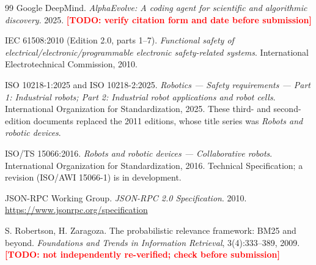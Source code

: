 \documentclass[11pt]{article}
\newcommand{\TODO}[1]{\textcolor{red}{\textbf{[TODO: #1]}}}
\begin{document}
\begin{thebibliography}{99}
 Google DeepMind. \emph{AlphaEvolve: A coding agent for scientific
and algorithmic discovery}. 2025. \TODO{verify citation form and date before submission}

 IEC 61508:2010 (Edition 2.0, parts 1--7). \emph{Functional safety of
electrical/electronic/programmable electronic safety-related systems}. International
Electrotechnical Commission, 2010.

 ISO 10218-1:2025 and ISO 10218-2:2025. \emph{Robotics --- Safety
requirements --- Part 1: Industrial robots; Part 2: Industrial robot applications and robot
cells}. International Organization for Standardization, 2025. These third- and
second-edition documents replaced the 2011 editions, whose title series was
\emph{Robots and robotic devices}.

 ISO/TS 15066:2016. \emph{Robots and robotic devices --- Collaborative
robots}. International Organization for Standardization, 2016. Technical Specification;
a revision (ISO/AWI 15066-1) is in development.

 JSON-RPC Working Group. \emph{JSON-RPC 2.0 Specification}. 2010.
\url{https://www.jsonrpc.org/specification}

 S. Robertson, H. Zaragoza. The probabilistic relevance framework:
BM25 and beyond. \emph{Foundations and Trends in Information Retrieval}, 3(4):333--389,
2009. \TODO{not independently re-verified; check before submission}

\end{thebibliography}
\end{document}
